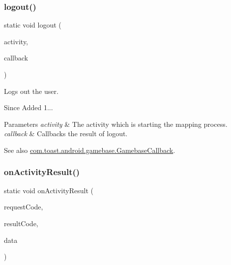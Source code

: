 \subsubsection{\texorpdfstring{logout()}{logout()}}
{\footnotesize\ttfamily static void logout (\begin{DoxyParamCaption}\item[{@Non\+Null final Activity}]{activity,  }\item[{@Nullable final \hyperlink{interfacecom_1_1toast_1_1android_1_1gamebase_1_1_gamebase_callback}{Gamebase\+Callback}}]{callback }\end{DoxyParamCaption})\hspace{0.3cm}{\ttfamily [static]}}



Logs out the user. 

\begin{DoxySince}{Since}
Added 1... 
\end{DoxySince}

\begin{DoxyParams}{Parameters}
{\em activity} & The activity which is starting the mapping process. \\
\hline
{\em callback} & Callbacks the result of logout. \\
\hline
\end{DoxyParams}
\begin{DoxySeeAlso}{See also}
\hyperlink{interfacecom_1_1toast_1_1android_1_1gamebase_1_1_gamebase_callback}{com.\+toast.\+android.\+gamebase.\+Gamebase\+Callback}. 
\end{DoxySeeAlso}
\mbox{\label{classcom_1_1toast_1_1android_1_1gamebase_1_1_gamebase_a74cd8c74ed834e846c05c598708f1e8b}} 
\subsubsection{\texorpdfstring{on\+Activity\+Result()}{onActivityResult()}}
{\footnotesize\ttfamily static void on\+Activity\+Result (\begin{DoxyParamCaption}\item[{int}]{request\+Code,  }\item[{int}]{result\+Code,  }\item[{Intent}]{data }\end{DoxyParamCaption})\hspace{0.3cm}{\ttfamily [static]}}



